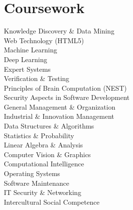 \documentclass[a4paper]{resume-cv}
\begin{document}
\pagebreak
\vfill
\noindent
\begin{minipage}[t]{0.42\textwidth}
	\section{Coursework}
	\medsep
	Knowledge Discovery \& Data Mining \\
	Web Technology (HTML5) \\
	Machine Learning \\
	Deep Learning \\
	Expert Systems \\
	Verification \& Testing \\
	Principles of Brain Computation (NEST) \\
	Security Aspects in Software Development \\
	General Management \& Organization \\
	Industrial \& Innovation Management\\
	\subsectionsep
	\medsep
	Data Structures \& Algorithms \\
	Statistics \& Probability \\
	Linear Algebra \& Analysis \\
	Computer Vision \& Graphics \\
	Computational Intelligence \\
	Operating Systems \\
	Software Maintenance \\
	IT Security \& Networking \\
	Intercultural Social Competence
	\sectionsep
	
\end{minipage}\quad %
\hfill %
\end{document}
